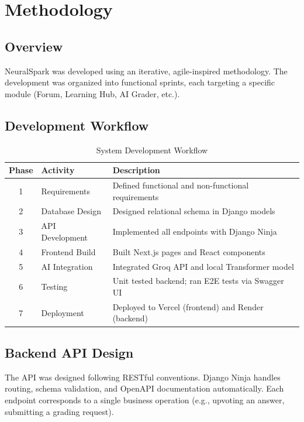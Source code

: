 \documentclass[12pt,a4paper]{report}
\begin{document}
\chapter{Methodology}

\section{Overview}
NeuralSpark was developed using an iterative, agile-inspired methodology. The development was
organized into functional sprints, each targeting a specific module (Forum, Learning Hub, AI Grader, etc.).

\section{Development Workflow}

\begin{table}[h]
\centering
\begin{tabular}{@{}clp{8cm}@{}}
\toprule
\textbf{Phase} & \textbf{Activity} & \textbf{Description} \\
\midrule
1 & Requirements & Defined functional and non-functional requirements \\
2 & Database Design & Designed relational schema in Django models \\
3 & API Development & Implemented all endpoints with Django Ninja \\
4 & Frontend Build & Built Next.js pages and React components \\
5 & AI Integration & Integrated Groq API and local Transformer model \\
6 & Testing & Unit tested backend; ran E2E tests via Swagger UI \\
7 & Deployment & Deployed to Vercel (frontend) and Render (backend) \\
\bottomrule
\end{tabular}
\caption{System Development Workflow}
\label{tab:workflow}
\end{table}

\section{Backend API Design}
The API was designed following RESTful conventions. Django Ninja handles routing, schema
validation, and OpenAPI documentation automatically. Each endpoint corresponds to a single
business operation (e.g., upvoting an answer, submitting a grading request).
\end{document}
